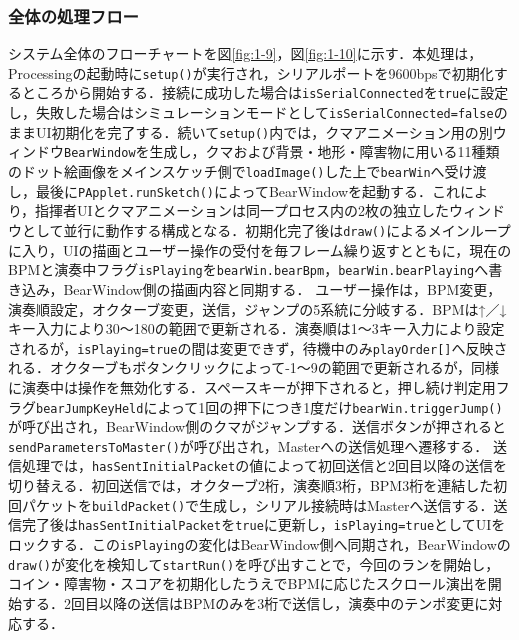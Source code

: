\documentclass[uplatex,dvipdfmx]{jlreq}
\begin{document}
\subsubsection{全体の処理フロー}
システム全体のフローチャートを図\ref{fig:1-9}，図\ref{fig:1-10}に示す．本処理は，Processingの起動時に\texttt{setup()}が実行され，シリアルポートを9600bpsで初期化するところから開始する．接続に成功した場合は\texttt{isSerialConnected}を\texttt{true}に設定し，失敗した場合はシミュレーションモードとして\texttt{isSerialConnected=false}のままUI初期化を完了する．続いて\texttt{setup()}内では，クマアニメーション用の別ウィンドウ\texttt{BearWindow}を生成し，クマおよび背景・地形・障害物に用いる11種類のドット絵画像をメインスケッチ側で\texttt{loadImage()}した上で\texttt{bearWin}へ受け渡し，最後に\texttt{PApplet.runSketch()}によってBearWindowを起動する．これにより，指揮者UIとクマアニメーションは同一プロセス内の2枚の独立したウィンドウとして並行に動作する構成となる．初期化完了後は\texttt{draw()}によるメインループに入り，UIの描画とユーザー操作の受付を毎フレーム繰り返すとともに，現在のBPMと演奏中フラグ\texttt{isPlaying}を\texttt{bearWin.bearBpm}，\texttt{bearWin.bearPlaying}へ書き込み，BearWindow側の描画内容と同期する．
ユーザー操作は，BPM変更，演奏順設定，オクターブ変更，送信，ジャンプの5系統に分岐する．BPMは↑／↓キー入力により30〜180の範囲で更新される．演奏順は1〜3キー入力により設定されるが，\texttt{isPlaying=true}の間は変更できず，待機中のみ\texttt{playOrder[]}へ反映される．オクターブもボタンクリックによって-1〜9の範囲で更新されるが，同様に演奏中は操作を無効化する．スペースキーが押下されると，押し続け判定用フラグ\texttt{bearJumpKeyHeld}によって1回の押下につき1度だけ\texttt{bearWin.triggerJump()}が呼び出され，BearWindow側のクマがジャンプする．送信ボタンが押されると\texttt{sendParametersToMaster()}が呼び出され，Masterへの送信処理へ遷移する．
送信処理では，\texttt{hasSentInitialPacket}の値によって初回送信と2回目以降の送信を切り替える．初回送信では，オクターブ2桁，演奏順3桁，BPM3桁を連結した初回パケットを\texttt{buildPacket()}で生成し，シリアル接続時はMasterへ送信する．送信完了後は\texttt{hasSentInitialPacket}を\texttt{true}に更新し，\texttt{isPlaying=true}としてUIをロックする．この\texttt{isPlaying}の変化はBearWindow側へ同期され，BearWindowの\texttt{draw()}が変化を検知して\texttt{startRun()}を呼び出すことで，今回のランを開始し，コイン・障害物・スコアを初期化したうえでBPMに応じたスクロール演出を開始する．2回目以降の送信はBPMのみを3桁で送信し，演奏中のテンポ変更に対応する．
\end{document}

